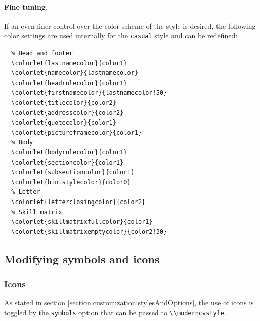 \documentclass[a4paper, 11pt]{article}
\newcommand{\code}[1]{\lstinline!#1!}
\begin{document}
\paragraph{Fine tuning.}
If an even finer control over the color scheme of the style is desired, the following color settings are used internally for the \code{casual} style and can be redefined:
\begin{lstlisting}
  % Head and footer
  \colorlet{lastnamecolor}{color1}
  \colorlet{namecolor}{lastnamecolor}
  \colorlet{headrulecolor}{color1}
  \colorlet{firstnamecolor}{lastnamecolor!50}
  \colorlet{titlecolor}{color2}
  \colorlet{addresscolor}{color2}
  \colorlet{quotecolor}{color1}
  \colorlet{pictureframecolor}{color1}
  % Body
  \colorlet{bodyrulecolor}{color1}
  \colorlet{sectioncolor}{color1}
  \colorlet{subsectioncolor}{color1}
  \colorlet{hintstylecolor}{color0}
  % Letter
  \colorlet{letterclosingcolor}{color2}
  % Skill matrix
  \colorlet{skillmatrixfullcolor}{color1}
  \colorlet{skillmatrixemptycolor}{color2!30}
\end{lstlisting}


\subsection{Modifying symbols and icons}
\subsubsection{Icons}\label{icon:usage}
As stated in section \ref{section:customization:stylesAndOptions}, the use of icons is toggled by the \code{symbols} option that can be passed to \code{\\moderncvstyle}.
\end{document}
